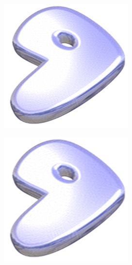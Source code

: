 \pagebreak
{}
\begin{figure}
  \centering
  \begin{subfigure}[b]{0.24\textwidth}
    \centering
    \includegraphics[width=\textwidth]{plaatjes/gentoo_fourier_0_15.png}
  \end{subfigure}
  \begin{subfigure}[b]{0.24\textwidth}
    \centering
    \includegraphics[width=\textwidth]{plaatjes/gentoo_fourier_0_1.png}

\end{subfigure}
\end{figure}
